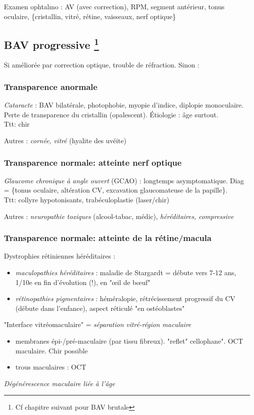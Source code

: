 \documentclass[11pt]{article}
\def\ttt{\hspace*{1cm}Ttt: }
\begin{document}
Examen ophtalmo : AV (avec correction), RPM, segment antérieur, tonus oculaire,
\{cristallin, vitré, rétine, vaisseaux, nerf optique\}

\subsection{BAV progressive \footnote{Cf chapitre suivant pour BAV brutale}}
\label{sec:org00afe67}
Si améliorée par correction optique, trouble de réfraction. Sinon :

\subsubsection{Transparence anormale}
\label{sec:org19d2aa2}
\emph{Cataracte} : BAV bilatérale, photophobie, myopie d'indice, diplopie
monoculaire. Perte de transparence du cristallin (opalescent). Étiologie : âge
surtout.\\
\ttt chir

Autres : \emph{cornée, vitré} (hyalite des uvéite)

\subsubsection{Transparence normale: atteinte nerf optique}
\label{sec:org239ec56}
\emph{Glaucome chronique à angle ouvert} (GCAO) : longtemps asymptomatique. Diag =
\{\inc tonus oculaire, altération CV, excavation glaucomateuse de la
papille\}. \\
\ttt collyre hypotonisants, trabéculoplastie (laser/chir)

Autres : \emph{neuropathie toxiques} (alcool-tabac, médic), \emph{héréditaires, compressive}

\subsubsection{Transparence normale: atteinte de la rétine/macula}
\label{sec:org00a8a58}
Dystrophies rétiniennes héréditaires :
\begin{itemize}
\item \emph{maculopathies héréditaires} : maladie de Stargardt = débute vers 7-12 ans,
1/10e en fin d'évolution (!), en "\oe{}il de b\oe{}uf"
\item \emph{rétinopathies pigmentaires} : héméralopie, rétrécissement progressif du CV
(débute dans l'enfance), aspect réticulé "en ostéoblastes"
\end{itemize}
"Interface vitréomaculaire" = \emph{séparation vitré-région maculaire}
\begin{itemize}
\item membranes épi-/pré-maculaire (par tissu fibreux). "reflet" cellophane". OCT
maculaire. Chir possible
\item trous maculaires : OCT
\end{itemize}
\emph{Dégénérescence maculaire liée à l'âge}
\end{document}

